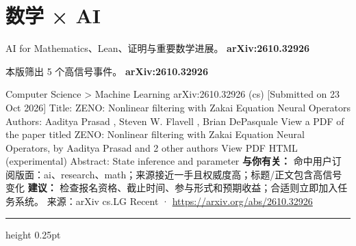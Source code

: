 \documentclass[10.5pt]{ctexart}
\begin{document}
\section*{数学 × AI}
{\color{ormuted} AI for Mathematics、Lean、证明与重要数学进展。}
\vspace{2mm}
{\LARGE\bfseries arXiv:2610.32926}\par
\vspace{1mm}
{\color{ormuted} 本版筛出 5 个高信号事件。}
\vspace{3mm}
{\Large\bfseries arXiv:2610.32926}\par
Computer Science > Machine Learning arXiv:2610.32926 (cs) [Submitted on 23 Oct 2026] Title: ZENO: Nonlinear filtering with Zakai Equation Neural Operators Authors: Aaditya Prasad , Steven W. Flavell , Brian DePasquale View a PDF of the paper titled ZENO: Nonlinear filtering with Zakai Equation Neural Operators, by Aaditya Prasad and 2 other authors View PDF HTML (experimental) Abstract: State inference and parameter 
\textbf{与你有关：} 命中用户订阅版面：ai、research、math；来源接近一手且权威度高；标题/正文包含高信号变化
\textbf{建议：} 检查报名资格、截止时间、参与形式和预期收益；合适则立即加入任务系统。
{\footnotesize\color{ormuted} 来源：arXiv cs.LG Recent · \url{https://arxiv.org/abs/2610.32926}}
\vspace{4mm}
\hrule height 0.25pt
\vspace{3mm}
\end{document}
